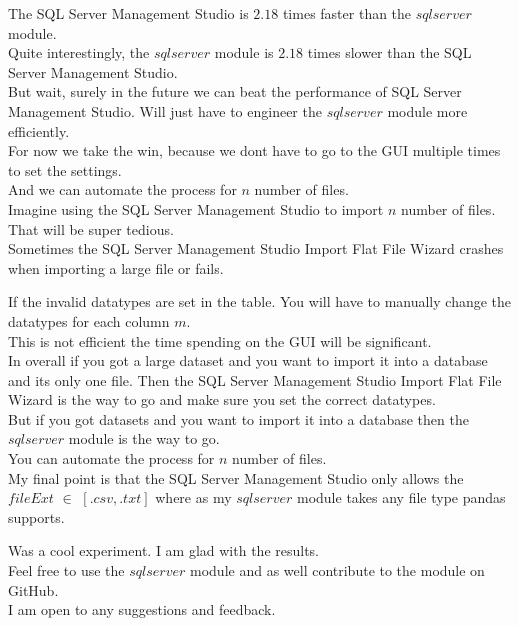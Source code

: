 The SQL Server Management Studio is $2.18$ times faster than the $sqlserver$ module. \\
Quite interestingly, the $sqlserver$ module is $2.18$ times slower than the SQL Server Management Studio. \\

But wait, surely in the future we can beat the performance of SQL Server Management Studio. Will just have to engineer the $sqlserver$ module more efficiently. \\

For now we take the win, because we dont have to go to the GUI multiple times to set the settings. \\
And we can automate the process for $n$ number of files. \\

Imagine using the SQL Server Management Studio to import $n$ number of files. \\
That will be super tedious. \\

Sometimes the SQL Server Management Studio Import Flat File Wizard crashes when importing a large file or fails.

If the invalid datatypes are set in the table. You will have to manually change the datatypes for each column $m$. \\
This is not efficient the time spending on the GUI will be significant. \\

In overall if you got a large dataset and you want to import it into a database and its only one file.
Then the SQL Server Management Studio Import Flat File Wizard is the way to go and make sure you set the correct datatypes. \\
But if you got datasets and you want to import it into a database then the $sqlserver$ module is the way to go. \\
You can automate the process for $n$ number of files. \\

My final point is that the SQL Server Management Studio only allows the \\ 
$fileExt$ $\in$ ${[.csv, .txt]}$ where as my $sqlserver$ module takes any file type pandas supports.

Was a cool experiment. I am glad with the results. \\

Feel free to use the $sqlserver$ module and as well contribute to the module on GitHub. \\
I am open to any suggestions and feedback. \\












